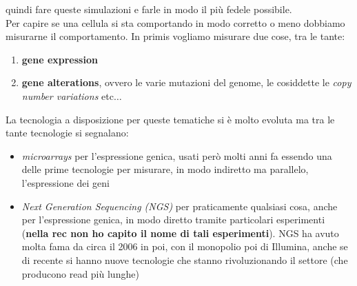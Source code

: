 \documentclass[a4paper,12pt, oneside]{book}
\begin{document}
quindi fare queste simulazioni e farle in modo il più fedele possibile.\\
Per capire se una cellula si sta comportando in modo corretto o meno dobbiamo
misurarne il comportamento. In primis vogliamo misurare due cose, tra le tante:
\begin{enumerate}
  \item \textbf{gene expression}
  \item \textbf{gene alterations}, ovvero le varie mutazioni del genome, le
  cosiddette le \textit{copy number variations} etc$\ldots$
\end{enumerate}
La tecnologia a disposizione per queste tematiche si è molto evoluta ma tra le
tante tecnologie si segnalano:
\begin{itemize}
  \item \textit{microarrays} per l'espressione genica, usati però molti anni fa
  essendo una delle prime tecnologie per misurare, in modo indiretto ma
  parallelo, l'espressione dei geni
  \item \textit{Next Generation Sequencing (NGS)} per praticamente qualsiasi
  cosa, anche per l'espressione genica, in modo diretto tramite particolari
  esperimenti (\textbf{nella rec non ho capito il nome di tali
    esperimenti}). NGS ha avuto molta fama da circa il 2006 in poi, con il
  monopolio poi di Illumina, anche se di recente si hanno nuove tecnologie che
  stanno rivoluzionando il settore (che producono read più lunghe)
\end{itemize}
\end{document}
